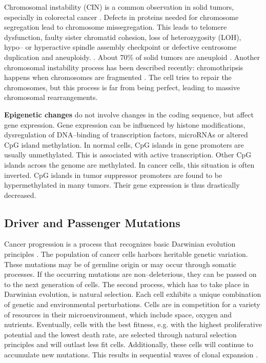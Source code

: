     Chromosomal instability (CIN) is a common observation in solid
    tumors, especially in colorectal cancer {\cite{cin_crc}}. Defects in
    proteins needed for chromosome segregation lead to chromosome
    missegregation. This leads to telomere dysfunction, faulty sister chromatid
    cohesion, loss of heterozygosity (LOH), hypo-- or hyperactive spindle
    assembly checkpoint or defective centrosome duplication and aneuploidy.
    {\cite{cin_crc}}. About 70\% of solid tumors are aneuploid
    {\cite{aneuploidy}}. Another chromosomal instability process has been
    described recently: chromothripsis happens when chromosomes are fragmented
    {\cite{chromothripsis_1}} {\cite{chromothripsis_2}}
    {\cite{chromothripsis_2}}. The cell tries to repair the chromosomes, but
    this process is far from being perfect, leading to massive chromosomal
    rearrangements.

    \textbf{Epigenetic changes} do not involve changes in the coding sequence,
    but affect gene expression. Gene expression can be influenced by histone
    modifications, dysregulation of DNA--binding of transcription factors,
    microRNAs or altered CpG island methylation. In normal cells, CpG islands in
    gene promoters are usually unmethylated. This is associated with active
    transcription. Other CpG islands across the genome are methylated.
    In cancer cells, this situation is often inverted. CpG islands in tumor
    suppressor promoters are found to be hypermethylated in many tumors. Their
    gene expression is thus drastically decreased.

  \subsection{Driver and Passenger Mutations}

    Cancer progression is a process that recognizes basic Darwinian evolution
    principles {\cite{clonal_evolution}} {\cite{darwinian_models}}
    {\cite{war_zone}} {\cite{cancer_models}}. The population of cancer cells
    harbors heritable genetic variation. These mutations may be of germline
    origin or may occur through somatic processes. If the occurring mutations
    are non--deleterious, they can be passed on to the next generation of
    cells. The second process, which has to take place in Darwinian evolution,
    is natural selection. Each cell exhibits a unique combination of genetic
    and environmental perturbations. Cells are in competition for a variety of
    resources in their microenvironment, which include space, oxygen and
    nutrients. Eventually, cells with the best fitness, e.g. with the highest
    proliferative potential and the lowest death rate, are selected
    through natural selection principles and will outlast less fit
    cells. Additionally, these cells will continue to accumulate new
    mutations. This results in sequential waves of clonal expansion
    {\cite{clonal_evolution}}.

